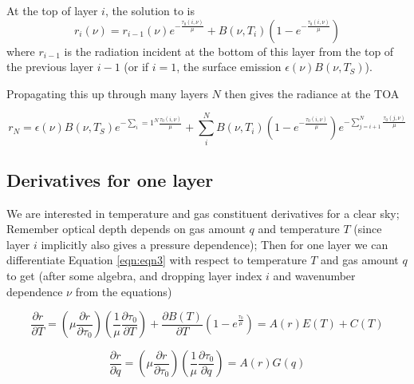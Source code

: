 \documentclass[11pt]{article}
\begin{document}
At the top of layer $i$, the solution to is
\begin{equation}
r_i(\nu) = r_{i-1}(\nu) e^{-\frac{\tau_{0}(i,\nu)}{\mu}} + B(\nu,T_i) (1 - e^{-\frac{\tau_{0}(i,\nu)}{\mu}})
\label{eqn:eqn3}
\end{equation}
where $r_{i-1}$ is the radiation incident at the bottom of this layer
from the top of the previous layer $i-1$ (or if $i=1$, the surface
emission $\epsilon(\nu) B(\nu,T_S)$).

Propagating this up through many layers $N$ then gives the radiance at the TOA

\begin{equation}
r_{N} = \epsilon(\nu) B(\nu,T_S) e^{-\sum_i=1^N \frac{\tau_{0}(i,\nu)}{\mu}} + \sum_i^N B(\nu,T_i) (1 - e^{-\frac{\tau_{0}(i,\nu)}{\mu}}) e^{-\sum_{j=i+1}^N \frac{\tau_{0}(j,\nu)}{\mu}}
\label{eqn:eqn4}
\end{equation}

\subsection{Derivatives for one layer}

We are interested in temperature and gas constituent derivatives for a
clear sky; Remember optical depth depends on gas amount $q$ and
temperature $T$ (since layer $i$ implicitly also gives a pressure
dependence); Then for one layer we can differentiate Equation \ref{eqn:eqn3}
with respect to temperature $T$ and gas amount $q$ to get (after some
algebra, and dropping layer index $i$ and wavenumber dependence $\nu$
from the equations)

\begin{equation}
\frac{\partial r}{\partial T} = \left( \mu \frac{\partial r}{\partial \tau_0} \right) \left( \frac{1}{\mu} \frac{\partial \tau_0}{\partial T} \right) + \frac{\partial B(T)}{\partial T} (1 - e^{\frac{\tau_0}{\mu}}) = A(r) E(T) + C(T)
\label{eqn:eqn1T}
\end{equation}

\begin{equation}
\frac{\partial r}{\partial q} = \left( \mu \frac{\partial r}{\partial \tau_0} \right) \left(   \frac{1}{\mu} \frac{\partial \tau_0}{\partial q} \right)  = A(r) G(q)
\label{eqn:eqn1Q}
\end{equation}
\end{document}
